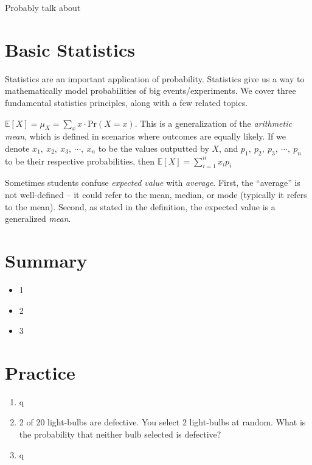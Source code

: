 \documentclass[main.tex]{subfiles}
\begin{document}
\begin{defn}
	
\end{defn}

Probably talk about 

\section{Basic Statistics}

Statistics are an important application of probability. Statistics give us a way to mathematically model probabilities of big events/experiments. We cover three fundamental statistics principles, along with a few related topics.

\begin{defn}
	\(\mathbb{E}[X] = \mu_X = \sum_{x}^{} x \cdot \mathrm{Pr}(X = x)\). This is a generalization of the \textit{arithmetic mean}, which is defined in scenarios where outcomes are equally likely. If we denote \(x_1,\ x_2,\ x_3,\ \cdots,\ x_n\) to be the values outputted by \(X\), and \(p_1,\ p_2,\ p_3,\ \cdots,\ p_n\) to be their respective probabilities, then \(\mathbb{E}[X] = \sum_{i=1}^{n} x_i p_i\)
\end{defn}

Sometimes students confuse \textit{expected value} with \textit{average}. First, the ``average'' is not well-defined -- it could refer to the mean, median, or mode (typically it refers to the mean). Second, as stated in the definition, the expected value is a generalized \textit{mean}.

\begin{defn}
	
\end{defn}

\begin{defn}
	
\end{defn}

\section{Summary}

\begin{itemize}
	\item 1
	\item 2
	\item 3
\end{itemize}

\section{Practice}

\begin{enumerate}
	\item q
	\item 2 of 20 light-bulbs are defective. You select 2 light-bulbs at random. What is the probability that neither bulb selected is defective?
	\item q
\end{enumerate}
\end{document}
